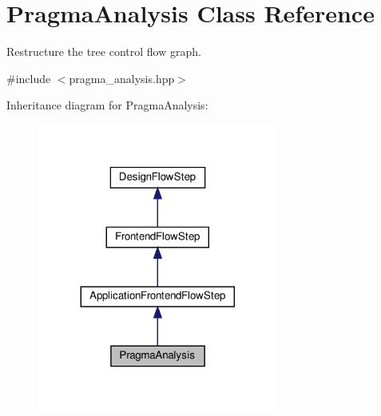 \hypertarget{classPragmaAnalysis}{}\section{Pragma\+Analysis Class Reference}
\label{classPragmaAnalysis}


Restructure the tree control flow graph.  




{\ttfamily \#include $<$pragma\+\_\+analysis.\+hpp$>$}



Inheritance diagram for Pragma\+Analysis\+:
\nopagebreak
\begin{figure}[H]
\begin{center}
\leavevmode
\includegraphics[width=224pt]{d3/d28/classPragmaAnalysis__inherit__graph}
\end{center}
\end{figure}


